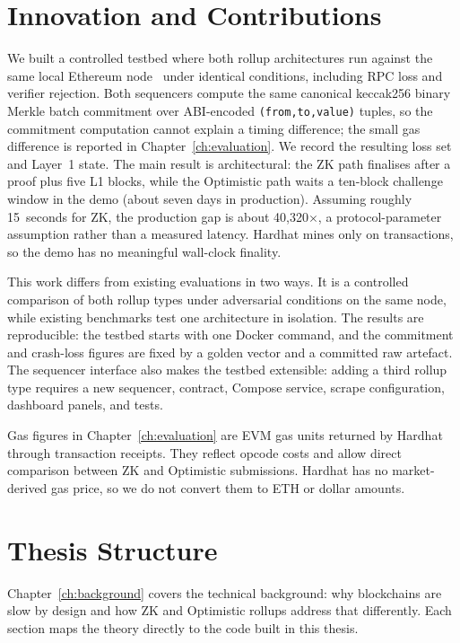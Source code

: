 \section{Innovation and Contributions}

We built a controlled testbed where both rollup architectures run against the same local Ethereum node~\cite{hardhat2024} under identical conditions, including RPC loss and verifier rejection. Both sequencers compute the same canonical keccak256 binary Merkle batch commitment over ABI-encoded \texttt{(from,to,value)} tuples, so the commitment computation cannot explain a timing difference; the small gas difference is reported in Chapter~\ref{ch:evaluation}. We record the resulting loss set and Layer~1 state. The main result is architectural: the ZK path finalises after a proof plus five L1 blocks, while the Optimistic path waits a ten-block challenge window in the demo (about seven days in production). Assuming roughly 15~seconds for ZK, the production gap is about 40,320$\times$, a protocol-parameter assumption rather than a measured latency. Hardhat mines only on transactions, so the demo has no meaningful wall-clock finality.

This work differs from existing evaluations in two ways. It is a controlled comparison of both rollup types under adversarial conditions on the same node, while existing benchmarks test one architecture in isolation. The results are reproducible: the testbed starts with one Docker command, and the commitment and crash-loss figures are fixed by a golden vector and a committed raw artefact. The sequencer interface also makes the testbed extensible: adding a third rollup type requires a new sequencer, contract, Compose service, scrape configuration, dashboard panels, and tests.

Gas figures in Chapter~\ref{ch:evaluation} are EVM gas units returned by Hardhat through transaction receipts. They reflect opcode costs and allow direct comparison between ZK and Optimistic submissions. Hardhat has no market-derived gas price, so we do not convert them to ETH or dollar amounts.

\section{Thesis Structure}

Chapter~\ref{ch:background} covers the technical background: why blockchains are slow by design and how ZK and Optimistic rollups address that differently. Each section maps the theory directly to the code built in this thesis.

